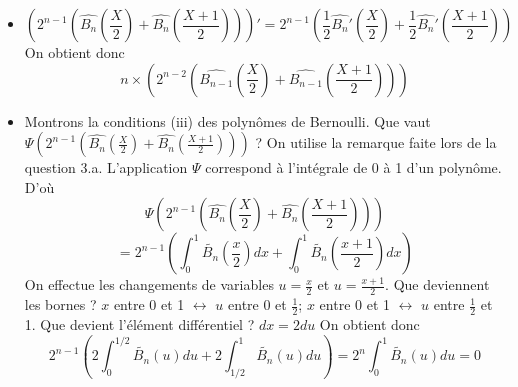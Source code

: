 \begin{enumerate}
\begin{itemize}
\item \[(2^{n-1}(\widehat{B_n}\left(\frac{X}{2}\right)+\widehat{B_n}\left(\frac{X+1}{2}\right)))'=2^{n-1}(\frac{1}{2}\widehat{B_n}'\left(\frac{X}{2}\right)+\frac{1}{2}\widehat{B_n}'\left(\frac{X+1}{2}\right))\]
On obtient donc
	\[n\times (2^{n-2}(\widehat{B_{n-1}}\left(\frac{X}{2}\right)+\widehat{B_{n-1}}\left(\frac{X+1}{2}\right)))\]
	
\item Montrons la conditions (iii) des polynômes de Bernoulli. Que vaut $\Psi (2^{n-1}(\widehat{B_n}\left(\frac{X}{2}\right)+\widehat{B_n}\left(\frac{X+1}{2}\right)))$ ?	\newline 
On utilise la remarque faite lors de la question 3.a. L'application $\Psi$ correspond à l'intégrale de 0 à 1 d'un polynôme. D'où
	\[\Psi (2^{n-1}(\widehat{B_n}\left(\frac{X}{2}\right)+\widehat{B_n}\left(\frac{X+1}{2}\right)))\]
	\[= 2^{n-1}(\int_0^1\widetilde{B_n}\left(\frac{x}{2}\right)dx+\int_0^1\widetilde{B_n}\left(\frac{x+1}{2}\right)dx)\]
On effectue les changements de variables $u=\frac{x}{2}$ et $u=\frac{x+1}{2}$.\newline 
Que deviennent les bornes ? $x$ entre 0 et 1 $\leftrightarrow$ $u$ entre 0 et $\frac{1}{2}$; $x$ entre 0 et 1 $\leftrightarrow$ $u$ entre $\frac{1}{2}$ et 1.\newline 
Que devient l'élément différentiel ? $dx=2du$\newline
 On obtient donc
	\[2^{n-1}(2\int_0^{1/2}\widetilde{B_n}(u)du+2\int_{1/2}^1\widetilde{B_n}(u)du)=2^n\int_0^1\widetilde{B_n}(u)du=0\]
\end{itemize}
	

\end{enumerate}
